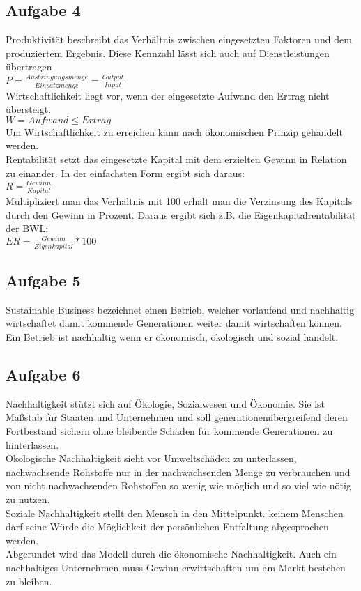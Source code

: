 \documentclass{article}
\begin{document}
	\subsection*{Aufgabe 4}
	Produktivität beschreibt das Verhältnis zwischen eingesetzten Faktoren und dem produziertem Ergebnis. Diese Kennzahl lässt sich auch auf Dienstleistungen übertragen \\
	$P = \frac{Ausbringungsmenge}{Einsatzmenge} = \frac{Output}{Input}$ \\
	Wirtschaftlichkeit liegt vor, wenn der eingesetzte Aufwand den Ertrag nicht übersteigt. \\
	$W = Aufwand \leq Ertrag$ \\
	Um Wirtschaftlichkeit zu erreichen kann nach ökonomischen Prinzip gehandelt werden. \\
	Rentabilität setzt das eingesetzte Kapital mit dem erzielten Gewinn in Relation zu einander. In der einfachsten Form ergibt sich daraus: \\
	$R = \frac{Gewinn}{Kapital}$ \\
	Multipliziert man das Verhältnis mit 100 erhält man die Verzinsung des Kapitals durch den Gewinn in Prozent. Daraus ergibt sich z.B. die Eigenkapitalrentabilität der BWL: \\
	$ER = \frac{Gewinn}{Eigenkapital} * 100$ \\
	
	
	
	\subsection*{Aufgabe 5}
	Sustainable Business bezeichnet einen Betrieb, welcher vorlaufend und nachhaltig wirtschaftet damit kommende Generationen weiter damit wirtschaften können. Ein Betrieb ist nachhaltig wenn er ökonomisch, ökologisch und sozial handelt.
	
	\subsection*{Aufgabe 6}
	Nachhaltigkeit stützt sich auf Ökologie, Sozialwesen und Ökonomie. Sie ist Maßstab für Staaten und Unternehmen und soll generationenübergreifend deren Fortbestand sichern ohne bleibende Schäden für kommende Generationen zu hinterlassen. \\
	Ökologische Nachhaltigkeit sieht vor Umweltschäden zu unterlassen, nachwachsende Rohstoffe nur in der nachwachsenden Menge zu verbrauchen und von nicht nachwachsenden Rohstoffen so wenig wie möglich und so viel wie nötig zu nutzen. \\
	Soziale Nachhaltigkeit stellt den Mensch in den Mittelpunkt. keinem Menschen darf seine Würde die Möglichkeit der persönlichen Entfaltung abgesprochen werden. \\
	Abgerundet wird das Modell durch die ökonomische Nachhaltigkeit. Auch ein nachhaltiges Unternehmen muss Gewinn erwirtschaften um am Markt bestehen zu bleiben.
	
\end{document}
